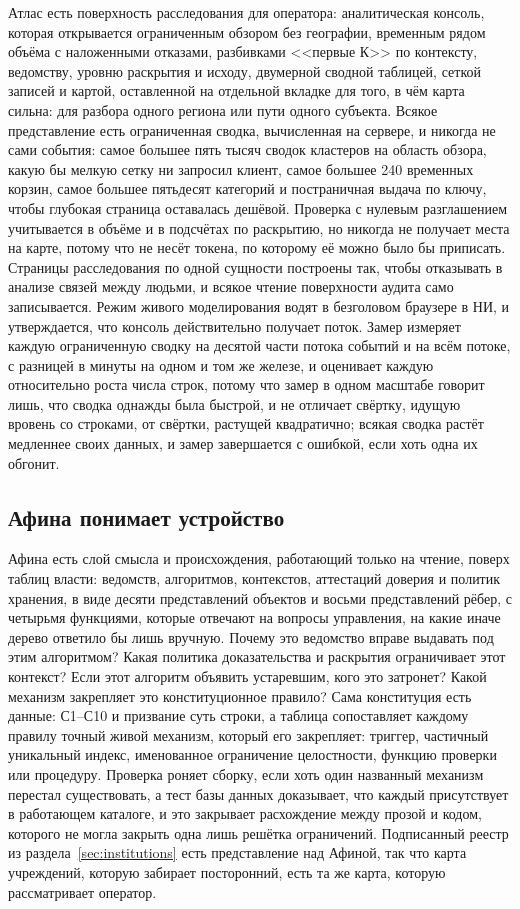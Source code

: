 Атлас есть поверхность расследования для оператора: аналитическая консоль, которая открывается
ограниченным обзором без географии, временным рядом объёма с наложенными отказами, разбивками
<<первые К>> по контексту, ведомству, уровню раскрытия и исходу, двумерной сводной таблицей,
сеткой записей и картой, оставленной на отдельной вкладке для того, в чём карта сильна: для
разбора одного региона или пути одного субъекта. Всякое представление есть ограниченная сводка,
вычисленная на сервере, и никогда не сами события: самое большее пять тысяч сводок кластеров
на область обзора, какую бы мелкую сетку ни запросил клиент, самое большее 240 временных корзин, самое большее пятьдесят категорий и
постраничная выдача по ключу, чтобы глубокая страница оставалась дешёвой. Проверка с нулевым
разглашением учитывается в объёме и в подсчётах по раскрытию, но никогда не получает места на
карте, потому что не несёт токена, по которому её можно было бы приписать. Страницы расследования
по одной сущности построены так, чтобы отказывать в анализе связей между людьми, и всякое чтение
поверхности аудита само записывается. Режим живого моделирования водят в безголовом браузере в НИ,
и утверждается, что консоль действительно получает поток. Замер измеряет
каждую ограниченную сводку на десятой части потока событий и на всём потоке, с разницей в минуты
на одном и том же железе, и оценивает каждую относительно роста числа строк, потому что замер в
одном масштабе говорит лишь, что сводка однажды была быстрой, и не отличает свёртку, идущую вровень
со строками, от свёртки, растущей квадратично; всякая сводка растёт медленнее своих данных, и замер
завершается с ошибкой, если хоть одна их обгонит. \sImpl

\subsection{Афина понимает устройство}

Афина есть слой смысла и происхождения, работающий только на чтение, поверх таблиц власти:
ведомств, алгоритмов, контекстов, аттестаций доверия и политик хранения, в виде десяти
представлений объектов и восьми представлений рёбер, с четырьмя функциями, которые отвечают на
вопросы управления, на какие иначе дерево ответило бы лишь вручную. Почему это ведомство вправе
выдавать под этим алгоритмом? Какая политика доказательства и раскрытия ограничивает этот
контекст? Если этот алгоритм объявить устаревшим, кого это затронет? Какой механизм закрепляет это
конституционное правило? Сама конституция есть данные: С1--С10 и призвание суть строки, а таблица
сопоставляет каждому правилу точный живой механизм, который его закрепляет: триггер, частичный
уникальный индекс, именованное ограничение целостности, функцию проверки или процедуру. Проверка
роняет сборку, если хоть один названный механизм перестал существовать, а тест базы данных
доказывает, что каждый присутствует в работающем каталоге, и это закрывает расхождение между
прозой и кодом, которого не могла закрыть одна лишь решётка ограничений. Подписанный реестр из
раздела~\ref{sec:institutions} есть представление над Афиной, так что карта учреждений, которую
забирает посторонний, есть та же карта, которую рассматривает оператор. \sImpl

